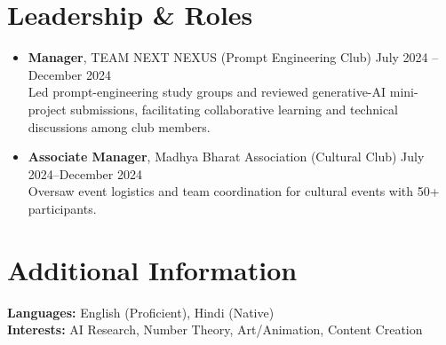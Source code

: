 \documentclass[11pt]{article}
\begin{document}
\section*{Leadership \& Roles}
\begin{itemize}
    \item \textbf{Manager}, TEAM NEXT NEXUS (Prompt Engineering Club) \hfill July 2024 -- December 2024\\
    Led prompt-engineering study groups and reviewed generative-AI mini-project submissions, facilitating collaborative learning and technical discussions among club members.
    \item \textbf{Associate Manager}, Madhya Bharat Association (Cultural Club) \hfill July 2024--December 2024\\
    Oversaw event logistics and team coordination for cultural events with 50+ participants.
\end{itemize}

\section*{Additional Information}
\textbf{Languages:} English (Proficient), Hindi (Native) \\
\textbf{Interests:} AI Research, Number Theory, Art/Animation, Content Creation
\end{document}
